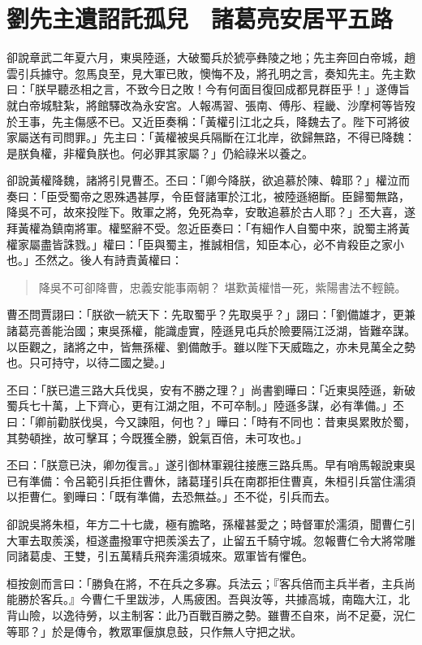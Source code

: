 
\chapter{劉先主遺詔託孤兒　諸葛亮安居平五路}

卻說章武二年夏六月，東吳陸遜，大破蜀兵於猇亭彝陵之地；先主奔回白帝城，趙雲引兵據守。忽馬良至，見大軍已敗，懊悔不及，將孔明之言，奏知先主。先主歎曰：「朕早聽丞相之言，不致今日之敗！今有何面目復回成都見群臣乎！」遂傳旨就白帝城駐紮，將館驛改為永安宮。人報馮習、張南、傅彤、程畿、沙摩柯等皆歿於王事，先主傷感不已。又近臣奏稱：「黃權引江北之兵，降魏去了。陛下可將彼家屬送有司問罪。」先主曰：「黃權被吳兵隔斷在江北岸，欲歸無路，不得已降魏：是朕負權，非權負朕也。何必罪其家屬？」仍給祿米以養之。

卻說黃權降魏，諸將引見曹丕。丕曰：「卿今降朕，欲追慕於陳、韓耶？」權泣而奏曰：「臣受蜀帝之恩殊遇甚厚，令臣督諸軍於江北，被陸遜絕斷。臣歸蜀無路，降吳不可，故來投陛下。敗軍之將，免死為幸，安敢追慕於古人耶？」丕大喜，遂拜黃權為鎮南將軍。權堅辭不受。忽近臣奏曰：「有細作人自蜀中來，說蜀主將黃權家屬盡皆誅戮。」權曰：「臣與蜀主，推誠相信，知臣本心，必不肯殺臣之家小也。」丕然之。後人有詩責黃權曰：

\begin{quote}
降吳不可卻降曹，忠義安能事兩朝？
堪歎黃權惜一死，紫陽書法不輕饒。
\end{quote}

曹丕問賈詡曰：「朕欲一統天下：先取蜀乎？先取吳乎？」詡曰：「劉備雄才，更兼諸葛亮善能治國；東吳孫權，能識虛實，陸遜見屯兵於險要隔江泛湖，皆難卒謀。以臣觀之，諸將之中，皆無孫權、劉備敵手。雖以陛下天威臨之，亦未見萬全之勢也。只可持守，以待二國之變。」

丕曰：「朕已遣三路大兵伐吳，安有不勝之理？」尚書劉曄曰：「近東吳陸遜，新破蜀兵七十萬，上下齊心，更有江湖之阻，不可卒制。」陸遜多謀，必有準備。」丕曰：「卿前勸朕伐吳，今又諫阻，何也？」曄曰：「時有不同也：昔東吳累敗於蜀，其勢頓挫，故可擊耳；今既獲全勝，銳氣百倍，未可攻也。」

丕曰：「朕意已決，卿勿復言。」遂引御林軍親往接應三路兵馬。早有哨馬報說東吳已有準備：令呂範引兵拒住曹休，諸葛瑾引兵在南郡拒住曹真，朱桓引兵當住濡須以拒曹仁。劉曄曰：「既有準備，去恐無益。」丕不從，引兵而去。

卻說吳將朱桓，年方二十七歲，極有膽略，孫權甚愛之；時督軍於濡須，聞曹仁引大軍去取羨溪，桓遂盡撥軍守把羨溪去了，止留五千騎守城。忽報曹仁令大將常雕同諸葛虔、王雙，引五萬精兵飛奔濡須城來。眾軍皆有懼色。

桓按劍而言曰：「勝負在將，不在兵之多寡。兵法云；『客兵倍而主兵半者，主兵尚能勝於客兵。』今曹仁千里跋涉，人馬疲困。吾與汝等，共據高城，南臨大江，北背山險，以逸待勞，以主制客：此乃百戰百勝之勢。雖曹丕自來，尚不足憂，況仁等耶？」於是傳令，教眾軍偃旗息鼓，只作無人守把之狀。

